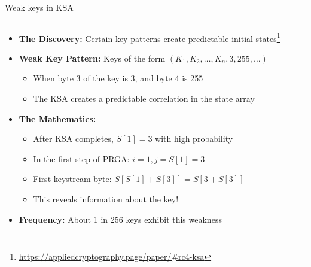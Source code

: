 \documentclass[aspectratio=169, lualatex, handout]{beamer}
\begin{document}
\begin{frame}{Weak keys in KSA}
	\begin{columns}[c]
		\begin{column}{1\textwidth}
			\begin{itemize}
				\item \textbf{The Discovery:} Certain key patterns create predictable initial states\footnote{\url{https://appliedcryptography.page/paper/\#rc4-ksa}}
				\item \textbf{Weak Key Pattern:} Keys of the form $(K_1, K_2, \ldots, K_n, 3, 255, \ldots)$
				      \begin{itemize}
					      \item When byte 3 of the key is 3, and byte 4 is 255
					      \item The KSA creates a predictable correlation in the state array
				      \end{itemize}
				\item \textbf{The Mathematics:}
				      \begin{itemize}
					      \item After KSA completes, $S[1] = 3$ with high probability
					      \item In the first step of PRGA: $i = 1, j = S[1] = 3$
					      \item First keystream byte: $S[S[1] + S[3]] = S[3 + S[3]]$
					      \item This reveals information about the key!
				      \end{itemize}
				\item \textbf{Frequency:} About 1 in 256 keys exhibit this weakness
			\end{itemize}
		\end{column}
	\end{columns}
\end{frame}
\end{document}
